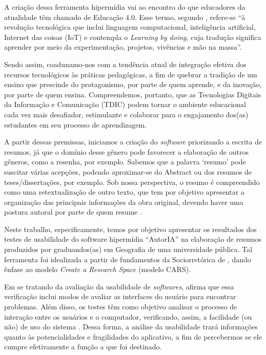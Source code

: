 \documentclass[portuguese]{textolivre}
\begin{document}
A criação dessa ferramenta hipermídia vai ao encontro do que educadores da atualidade têm chamado de Educação 4.0. Esse termo, segundo \textcite[p.~1]{garofalo2018}, refere-se “à revolução tecnológica que inclui linguagem computacional, inteligência artificial, Internet das coisas (IoT) e contempla o \textit{Learning by doing}, cuja tradução significa aprender por meio da experimentação, projetos, vivências e mão na massa”.

Sendo assim, coadunamo-nos com a tendência atual de integração efetiva dos recursos tecnológicos às práticas pedagógicas, a fim de quebrar a tradição de um ensino que prescinde do protagonismo, por parte de quem aprende, e da inovação, por parte de quem ensina. Compreendemos, portanto, que as Tecnologias Digitais da Informação e Comunicação (TDIC) podem tornar o ambiente educacional cada vez mais desafiador, estimulante e colaborar para o engajamento dos(as) estudantes em seu processo de aprendizagem.

A partir dessas premissas, iniciamos a criação do \textit{software} priorizando a escrita de resumos, já que o domínio desse gênero pode favorecer a elaboração de outros gêneros, como a resenha, por exemplo. Sabemos que a palavra ‘resumo’ pode suscitar várias acepções, podendo aproximar-se do Abstract ou dos resumos de teses/dissertações, por exemplo. Sob nossa perspectiva, o resumo é compreendido como uma retextualização de outro texto, que tem por objetivo apresentar a organização das principais informações da obra original, devendo haver uma postura autoral por parte de quem resume \cite{machado2004}.

Neste trabalho, especificamente, temos por objetivo apresentar os resultados dos testes de usabilidade do software hipermídia “AutorIA” na elaboração de resumos produzidos por graduandos(as) em Geografia de uma universidade pública. Tal ferramenta foi idealizada a partir de fundamentos da Sociorretórica de \textcite{swales1990}, dando ênfase ao modelo \textit{Create a Research Space} (modelo CARS).

Em se tratando da avaliação da usabilidade de \textit{softwares}, \textcite{nielsen1994} afirma que essa verificação inclui modos de avaliar as interfaces do usuário para encontrar problemas. Além disso, os testes têm como objetivo analisar o processo de interação entre os usuários e o computador, verificando, assim, a facilidade (ou não) de uso do sistema \cite{conrad2002}. Dessa forma, a análise da usabilidade trará informações quanto às potencialidades e fragilidades do aplicativo, a fim de percebermos se ele cumpre efetivamente a função a que foi destinado.  
\end{document}
